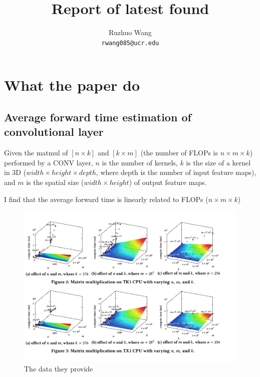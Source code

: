 \documentclass[10pt,twocolumn,letterpaper]{article}
\begin{document}
\title{Report of latest found}

\author{Ruzhuo Wang\\
	{\tt\small rwang085@ucr.edu}
	\and
}

\maketitle



\section{What the paper do }
\subsection{Average forward time estimation of convolutional layer}
Given the matmul of $[n\times k]$ and $[k\times m]$ (the number of FLOPs is
$n\times m\times k$) performed by a CONV layer, $n$ is the number of kernels, $k$
is the size of a kernel in 3D ($width\times height\times depth$, where depth is
the number of input feature maps), and $m$ is the spatial size ($width\times height$) of output feature maps. \par
I find that the average forward time is linearly related to FLOPs ($n\times m\times k$) 

\begin{figure}[h]
	\begin{center}
		
		\includegraphics[width=1\linewidth]{they1.png}
	\end{center}
	\caption{The data they provide}
	\label{fig:long1}
	\label{fig:onecol1}
\end{figure}
\end{document}
